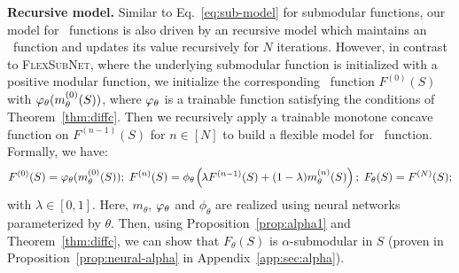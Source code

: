 \documentclass{article}
\newcommand{\our}{\textsc{Flex\-Sub\-Net}}
\newcommand{\xhdr}[1]{\noindent\textbf{#1.}}
\begin{document}
\xhdr{Recursive model} Similar to Eq.~\eqref{eq:sub-model} for submodular functions, our model for \asb\ functions is also driven by an recursive model which maintains an \asb\ function and updates its value recursively for $N$ iterations.
However, in contrast to \our, where the underlying submodular function is initialized with a positive modular function,
we initialize the corresponding \asb\ function $F^{(0)}(S)$ with $\varphi_{\theta}(m_{\theta} ^{(0)}(S))$, where $\varphi_{\theta}$ is a trainable function satisfying
the conditions of Theorem~\ref{thm:diffc}. Then we recursively apply  a trainable monotone concave function on $F^{(n-1)}(S)$ for $n\in[N]$ to build a flexible model for \asb\ function. Formally, we have: 
\begin{align}
F^{(0)}(S) =    \varphi_{\theta}(m^{(0)} _{\theta}(S)); \;
F^{(n)}(S) = \phi_{\theta} \hspace{-0.3mm}\left(\hspace{-0.3mm} \lambda  F^{(n-1)}(S)+  (1-\lambda)    m^{(n)} _{\theta}(S)\right); \;
F_{\theta}(S) =  F^{(N)}(S);
\label{eq:alpha-sub-model}
\end{align}
with $\lambda\in[0,1]$.  Here, $m_{\theta}$, $\varphi_{\theta}$ and $\phi_{\theta}$ are realized using neural networks parameterized by $\theta$.
% 
Then, using Proposition~\ref{prop:alpha1} and Theorem~\ref{thm:diffc}, we can show that $F_{\theta}(S)$ is $\alpha$-submodular in $S$ (proven in Proposition~\ref{prop:neural-alpha} in Appendix~\ref{app:sec:alpha}).
\end{document}
